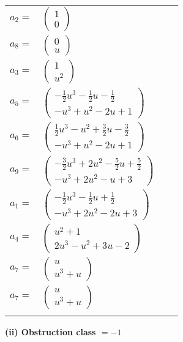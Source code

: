 \documentclass[1p]{elsarticle_modified}
\theoremstyle{definition}
\begin{document}
\begin{tabular}{m{7pt} m{180pt} m{7pt} m{180pt} }
\flushright $a_{2}=$&$\begin{pmatrix}1\\0\end{pmatrix}$ \\
\flushright $a_{8}=$&$\begin{pmatrix}0\\u\end{pmatrix}$ \\
\flushright $a_{3}=$&$\begin{pmatrix}1\\u^2\end{pmatrix}$ \\
\flushright $a_{5}=$&$\begin{pmatrix}-\frac{1}{2} u^3-\frac{1}{2} u-\frac{1}{2}\\- u^3+u^2-2 u+1\end{pmatrix}$ \\
\flushright $a_{6}=$&$\begin{pmatrix}\frac{1}{2} u^3- u^2+\frac{3}{2} u-\frac{3}{2}\\- u^3+u^2-2 u+1\end{pmatrix}$ \\
\flushright $a_{9}=$&$\begin{pmatrix}-\frac{3}{2} u^3+2 u^2-\frac{5}{2} u+\frac{5}{2}\\- u^3+2 u^2- u+3\end{pmatrix}$ \\
\flushright $a_{1}=$&$\begin{pmatrix}-\frac{1}{2} u^3-\frac{1}{2} u+\frac{1}{2}\\- u^3+2 u^2-2 u+3\end{pmatrix}$ \\
\flushright $a_{4}=$&$\begin{pmatrix}u^2+1\\2 u^3- u^2+3 u-2\end{pmatrix}$ \\
\flushright $a_{7}=$&$\begin{pmatrix}u\\u^3+u\end{pmatrix}$\\ \flushright $a_{7}=$&$\begin{pmatrix}u\\u^3+u\end{pmatrix}$\\&\end{tabular}
\flushleft \textbf{(ii) Obstruction class $= -1$}\\~\\
\end{document}
